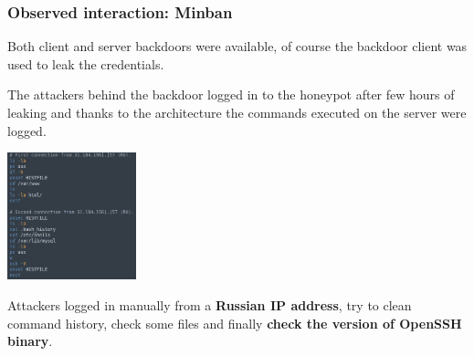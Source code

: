 \begin{frame}
	\frametitle{Observed interaction: Minban}
	
	Both client and server backdoors were available, of course the backdoor client was used to leak the credentials.
	
	\smallskip
	
	The attackers behind the backdoor logged in to the honeypot after few hours of leaking and thanks to the architecture the commands executed on the server were logged.
	
  \begin{center}    
  \includegraphics[width=0.28\textwidth]{images/minban}
  \end{center}
  	
  Attackers logged in manually from a \textbf{Russian IP address}, try to clean command history, check some files and finally \textbf{check the version of OpenSSH binary}.  

\end{frame}


